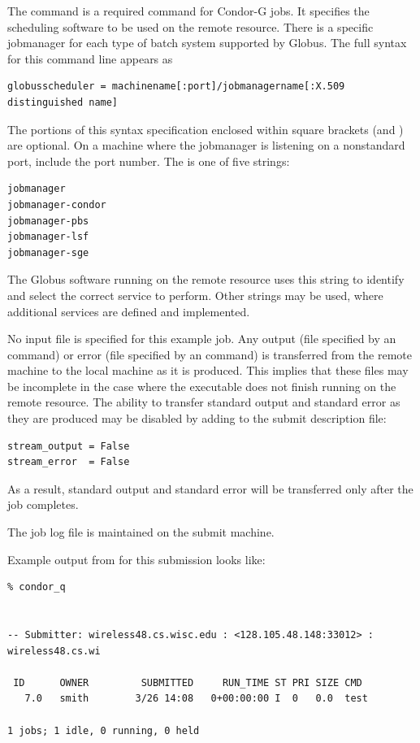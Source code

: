 The command  is a required command
for Condor-G jobs.
It specifies the scheduling software to be used on the remote resource.
There is a specific jobmanager for each type of
batch system supported by Globus.
The full syntax for this command line appears as
\footnotesize
\begin{verbatim}
globusscheduler = machinename[:port]/jobmanagername[:X.509 distinguished name]
\end{verbatim}
\normalsize
The portions of this syntax specification enclosed within
square brackets (\Lbr and \Rbr) are optional.
On a machine where the jobmanager is listening on a nonstandard port,
include the port number.
The \verb@jobmanagername@
is one of five strings:
\begin{verbatim}
jobmanager
jobmanager-condor
jobmanager-pbs
jobmanager-lsf
jobmanager-sge
\end{verbatim}
The Globus software running on the remote resource
uses this string to identify and select the correct service
to perform.
Other \verb@jobmanagername@ strings may be used,
where additional services are defined and implemented.


No input file is specified for this example job.
Any output (file specified by an  command)
or error (file specified by an  command)
is transferred 
from the remote machine to the local machine as it is produced.
This implies that these files may be incomplete in the case
where the executable does not finish running on the remote resource.
The ability to transfer standard output and standard error as
they are produced may be disabled by adding to the submit
description file:
\begin{verbatim}
stream_output = False
stream_error  = False
\end{verbatim}
As a result, standard output and standard error will be transferred
only after the job completes.

The job log file is maintained on the submit machine.

Example output from 
 for this submission looks like:
\footnotesize
\begin{verbatim}
% condor_q


-- Submitter: wireless48.cs.wisc.edu : <128.105.48.148:33012> : wireless48.cs.wi

 ID      OWNER         SUBMITTED     RUN_TIME ST PRI SIZE CMD
   7.0   smith        3/26 14:08   0+00:00:00 I  0   0.0  test

1 jobs; 1 idle, 0 running, 0 held
\end{verbatim}
\normalsize

